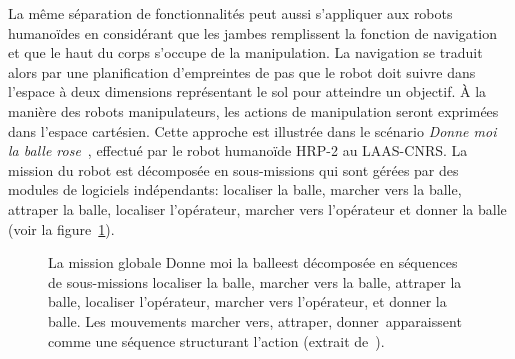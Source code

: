 La même séparation de fonctionnalités peut aussi s'appliquer
aux robots humanoïdes en considérant que les jambes 
remplissent la fonction de navigation et que le haut du corps
s'occupe de la manipulation. La navigation se traduit
alors par une planification d'empreintes de pas que le robot doit suivre dans l'espace à deux
dimensions représentant le sol pour atteindre un objectif. À la manière des robots manipulateurs,
les actions de manipulation seront exprimées dans l'espace cartésien.
Cette approche est illustrée dans le scénario \emph{Donne moi la balle rose}~\cite{yoshida07},
effectué par le robot humanoïde HRP-2 au LAAS-CNRS.
La mission du robot est décomposée en sous-missions qui sont gérées par des modules de logiciels
indépendants: localiser la balle, marcher vers la balle, attraper la balle,
localiser l'opérateur, marcher vers l'opérateur et donner la balle (voir la figure~\ref{fig:purpleBall}).
\begin{figure}[t]
  \centering
  \caption[\emph{Donne moi la balle}.]{La mission globale \lbrack Donne moi la balle\rbrack est décomposée en
  séquences de sous-missions \lbrack localiser la balle\rbrack, \lbrack marcher vers la balle\rbrack, 
  \lbrack attraper la balle\rbrack, \lbrack localiser l'opérateur\rbrack, \lbrack marcher vers l'opérateur\rbrack, 
  et \lbrack donner la balle\rbrack. Les mouvements \lbrack marcher vers\rbrack, \lbrack attraper\rbrack, 
  \lbrack donner\rbrack~apparaissent comme une séquence structurant l'action (extrait de~\cite{yoshida07}).}
  \label{fig:purpleBall}
\end{figure}

